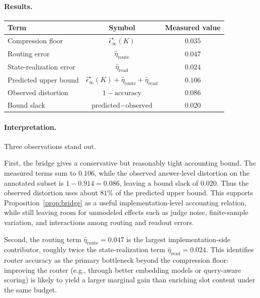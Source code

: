 \documentclass{article}
\theoremstyle{plain}
\theoremstyle{definition}
\theoremstyle{remark}
\newcommand{\eps}{\epsilon}
\begin{document}
\paragraph{Results.}

\begin{center}
\begin{tabular}{lcc}
\toprule
\textbf{Term} & \textbf{Symbol} & \textbf{Measured value} \\
\midrule
Compression floor & $\hat\eps^\star_\infty(K)$ & $0.035$ \\
Routing error & $\hat\eta_{\mathrm{route}}$ & $0.047$ \\
State-realization error & $\hat\eta_{\mathrm{read}}$ & $0.024$ \\
\midrule
Predicted upper bound &
$\hat\eps^\star_\infty(K)+\hat\eta_{\mathrm{route}}+\hat\eta_{\mathrm{read}}$ &
$0.106$ \\
Observed distortion & $1-\text{accuracy}$ & $0.086$ \\
Bound slack & $\text{predicted}-\text{observed}$ & $0.020$ \\
\bottomrule
\end{tabular}
\end{center}

\paragraph{Interpretation.}
Three observations stand out.

First, the bridge gives a conservative but reasonably tight accounting bound.
The measured terms sum to \(0.106\), while the observed answer-level
distortion on the annotated subset is \(1-0.914=0.086\), leaving a bound
slack of \(0.020\). Thus the observed distortion uses about \(81\%\) of the
predicted upper bound. This supports Proposition~\ref{prop:bridge} as a
useful implementation-level accounting relation, while still leaving room
for unmodeled effects such as judge noise, finite-sample variation, and
interactions among routing and readout errors.

Second, the routing term
\(\hat\eta_{\mathrm{route}}=0.047\) is the largest implementation-side
contributor, roughly twice the state-realization term
\(\hat\eta_{\mathrm{read}}=0.024\). This identifies router accuracy as the
primary bottleneck beyond the compression floor: improving the router
(e.g., through better embedding models or query-aware scoring) is likely to
yield a larger marginal gain than enriching slot content under the same
budget.
\end{document}
